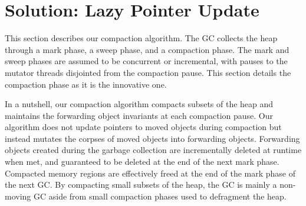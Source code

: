 \documentclass[sigplan,10pt,review,anonymous]{acmart}\settopmatter{printfolios=true,printccs=false,printacmref=false}
\begin{document}
%


\section{Solution: Lazy Pointer Update}
\label{sec:solution}

This section describes our compaction algorithm. The GC collects the heap through a mark phase, a sweep phase, and a compaction phase. The mark and sweep phases are assumed to be concurrent or incremental, with pauses to the mutator threads disjointed from the compaction pause.
This section details the compaction phase as it is the innovative one.
 
In a nutshell, our compaction algorithm compacts subsets of the heap and maintains the forwarding object invariants at each compaction pause. 
Our algorithm does not update pointers to moved objects during compaction but instead mutates the corpses of moved objects into forwarding objects. Forwarding objects created during the garbage collection are incrementally deleted at runtime when met, and guaranteed to be deleted at the end of the next mark phase. Compacted memory regions are effectively freed at the end of the mark phase of the next GC. By compacting small subsets of the heap, the GC is mainly a non-moving GC aside from small compaction phases used to defragment the heap.
\end{document}
